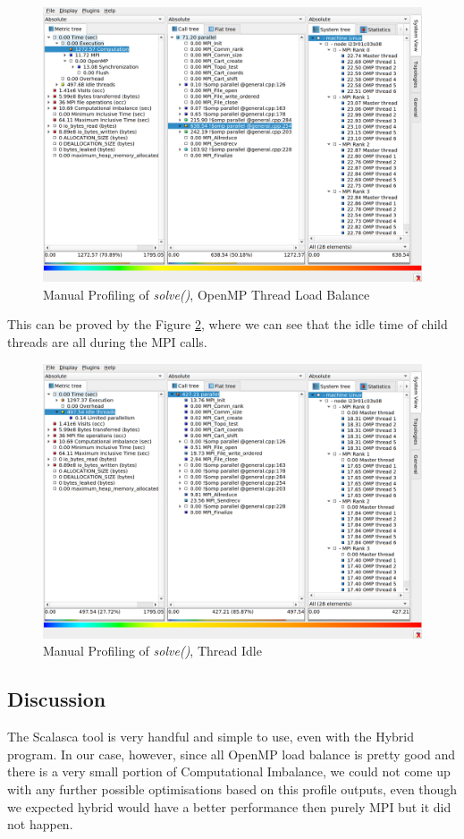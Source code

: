 \documentclass[article]{scrartcl}
\begin{document}
\begin{figure}[htpb]
	\centering
	\includegraphics[width=.9\textwidth,keepaspectratio=true]{../figs/3_3_hybrid_openmp_loadbalance.png}
	\caption{Manual Profiling of \textit{solve()}, OpenMP Thread Load Balance}
	\label{fig:hybrid_scalasca2}
\end{figure}

This can be proved by the Figure \ref{fig:hybrid_scalasca3}, where we can see that the idle time of child threads are all during the MPI calls.
\begin{figure}[htpb]
	\centering
	\includegraphics[width=.9\textwidth,keepaspectratio=true]{../figs/3_3_hybrid_idle.png}
	\caption{Manual Profiling of \textit{solve()}, Thread Idle}
	\label{fig:hybrid_scalasca3}
\end{figure}
\subsection{Discussion}
The Scalasca tool is very handful and simple to use, even with the Hybrid program. In our case, however, since all OpenMP load balance is pretty good and there is a very small portion of Computational Imbalance, we could not come up with any further possible optimisations based on this profile outputs, even though we expected hybrid would have a better performance then purely MPI but it did not happen.
\end{document}
